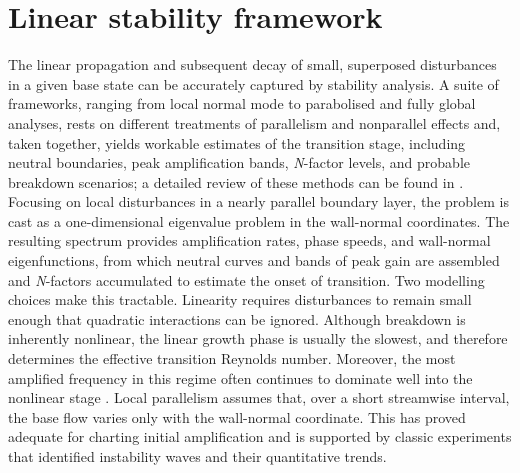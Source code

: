 \section{Linear stability framework}

The linear propagation and subsequent decay of small, superposed disturbances in a given base state can be accurately captured by stability analysis. A suite of frameworks, ranging from local normal mode to parabolised and fully global analyses, rests on different treatments of parallelism and nonparallel effects and, taken together, yields workable estimates of the transition stage, including neutral boundaries, peak amplification bands, \textit{N}-factor levels, and probable breakdown scenarios; a detailed review of these methods can be found in \citep{Theofilis2011}. Focusing on local disturbances in a nearly parallel boundary layer, the problem is cast as a one-dimensional eigenvalue problem in the wall-normal coordinates. The resulting spectrum provides amplification rates, phase speeds, and wall-normal eigenfunctions, from which neutral curves and bands of peak gain are assembled and \textit{N}-factors accumulated to estimate the onset of transition. Two modelling choices make this tractable. Linearity requires disturbances to remain small enough that quadratic interactions can be ignored. Although breakdown is inherently nonlinear, the linear growth phase is usually the slowest, and therefore determines the effective transition Reynolds number. Moreover, the most amplified frequency in this regime often continues to dominate well into the nonlinear stage \citep{Reshotko2001,Mack1984}. Local parallelism assumes that, over a short streamwise interval, the base flow varies only with the wall-normal coordinate. This has proved adequate for charting initial amplification and is supported by classic experiments that identified instability waves and their quantitative trends.

